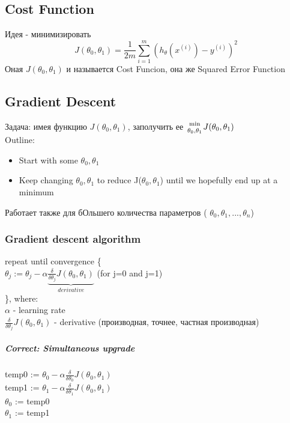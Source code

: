 \documentclass{scrartcl}
\begin{document}
\subsection {Cost Function}
\label{2-2}
Идея - минимизировать \[ J(\theta_0, \theta_1) = \frac{1}{2m}
\sum_{i=1}^m\left( h_\theta (x^{(i)}) - y^{(i)} \right)^2
\]
Оная $J(\theta_0, \theta_1)$ и называется Cost Funcion, она же Squared
Error Function

\subsection {Gradient Descent}
\label {2-5}
Задача: имея функцию $J(\theta_0, \theta_1)$, заполучить ее
${\min \atop \theta_0, \theta_1} J(\theta_0, \theta_1)$ \\
Outline:
\begin {itemize}
\item Start with some $\theta_0, \theta_1$
\item Keep changing $\theta_0, \theta_1$ to reduce J($\theta_0,
  \theta_1$) until we hopefully end up at a minimum
\end{itemize}
Работает также для бОльшего количества параметров ( $\theta_0,
\theta_1,..., \theta_n$)
\subsubsection {Gradient descent algorithm}
repeat until convergence \{ \\
$\theta_j := \theta_j - {\alpha} \underbrace{ \frac {\delta}{\delta
    \theta_j} J(\theta_0,
  \theta_1)}_{derivative}$ (for j=0 and j=1) \\
\}, where: \\
$\alpha$ - learning rate \\
$\frac {\delta}{\delta \theta_j} J(\theta_0, \theta_1)$ - derivative
(производная, точнее, частная производная)

\subparagraph {Correct: Simultaneous upgrade}

temp0 := $\theta_0 - \alpha \frac {\delta}{\delta \theta_0}
J(\theta_0,
\theta_1)$ \\
temp1 := $\theta_1 - \alpha \frac {\delta}{\delta \theta_1}
J(\theta_0,
\theta_1)$ \\
$\theta_0$ := temp0 \\
$\theta_1$ := temp1 \\
\end{document}
